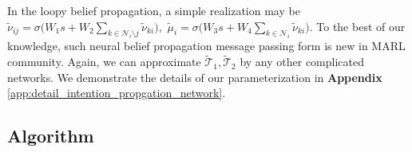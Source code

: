 \documentclass[11pt,a4paper]{article}
\theoremstyle{definition}
\begin{document}
In the loopy belief propagation,  a simple realization may be $\tilde{\nu}_{ij} =\sigma\big(  W_1s+ W_2 \sum_{k\in \mathcal{N}_i \setminus j} \tilde{\nu}_{ki} \big),$ $ \tilde{\mu}_i= \sigma \big( W_3s+W_4 \sum_{k\in \mathcal{N}_i} \tilde{\nu}_{ki} \big).$  To the best of our knowledge, such neural belief propagation message passing form is new in MARL community. Again, we can approximate $\tilde{\mathcal{T}}_1, \tilde{\mathcal{T}}_2$  by any other complicated networks. We demonstrate the details of our parameterization  in \textbf{Appendix} \ref{app:detail_intention_propgation_network}. 

\subsection{Algorithm}\label{section:algorithm}




\end{document}
